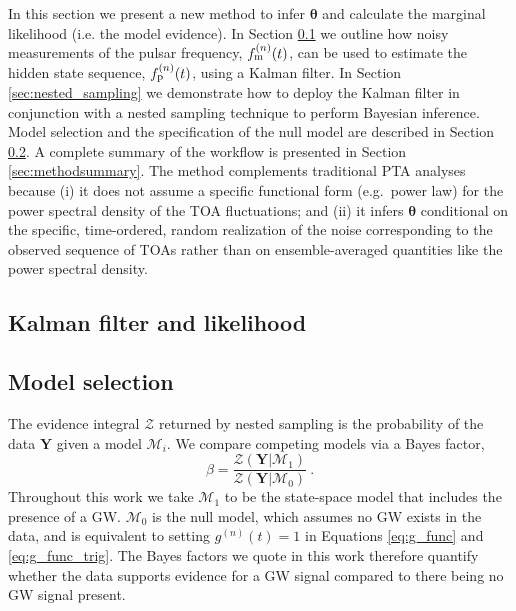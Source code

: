 \documentclass[fleqn,usenatbib,useAMS]{mnras}
\begin{document}
In this section we present a new method to infer $\boldsymbol{\theta}$ and calculate the marginal likelihood (i.e. the model evidence). In Section \ref{sec:kalman_filter} we outline how noisy measurements of the pulsar frequency, $f_{\rm m}^{(n)}(t)$, can be used to estimate the hidden state sequence, $f_{\rm p}^{(n)}(t)$, using a Kalman filter. In Section \ref{sec:nested_sampling} we demonstrate how to deploy the Kalman filter in conjunction with a nested sampling technique to perform Bayesian inference. Model selection and the specification of the null model are described in Section \ref{sec:model_selection}. A complete summary of the workflow is presented in Section \ref{sec:methodsummary}. The method complements traditional PTA analyses because (i) it does not assume a specific functional form (e.g.\ power law) for the power spectral density of the TOA fluctuations; and (ii) it infers ${\boldsymbol{\theta}}$ conditional on the specific, time-ordered, random realization of the noise corresponding to the observed sequence of TOAs rather than on ensemble-averaged quantities like the power spectral density.

\subsection{Kalman filter and likelihood}\label{sec:kalman_filter}







\subsection{Model selection}\label{sec:model_selection}
The evidence integral $\mathcal{Z}$ returned by nested sampling is the probability of the data $\boldsymbol{Y}$ given a model $\mathcal{M}_i$. We compare competing models via a Bayes factor,
\begin{equation}
	\beta = \frac{\mathcal{Z}(\boldsymbol{Y} | \mathcal{M}_1)}{\mathcal{Z}(\boldsymbol{Y} | \mathcal{M}_0)} \ . \label{eq:bayes}
\end{equation}
Throughout this work we take $\mathcal{M}_1$ to be the state-space model that includes the presence of a GW. $\mathcal{M}_0$ is the null model, which assumes no GW exists in the data, and is equivalent to setting $g^{(n)}(t)=1$ in Equations \eqref{eq:g_func} and \eqref{eq:g_func_trig}. The Bayes factors we quote in this work therefore quantify whether the data supports evidence for a GW signal compared to there being no GW signal present.



















\bsp	%
\label{lastpage}
\end{document}
